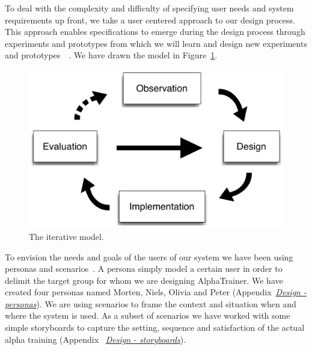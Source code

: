 \documentclass[a4paper,10pt,english,lof,lot,twoside]{puthesis}
\begin{document}
To deal with the complexity and difficulty of specifying user needs and system
requirements up front, we take a user centered approach to our design
process. This approach enables specifications to emerge during the design
process through experiments and prototypes from which we will learn and design
new experiments and prototypes \cite{benyon_designing_2005} \cite{klemmer_how_2006}. We have drawn the model in Figure \ref{ch-design/index:fig-iterative-model}.
\begin{figure}[tbp]
\centering
\capstart

\includegraphics[width=0.600\linewidth]{theiterativemodel.png}
\caption[The iterative model.]{The iterative model.}\label{ch-design/index:fig-iterative-model}\end{figure}

To envision the needs and goals of the users of our system we have been using
personas and scenarios \cite{kollmann_importance_2009}\cite{benyon_designing_2010}. A persona simply model a certain user in order
to delimit the target group for whom we are designing AlphaTrainer. We have
created four personas named Morten, Niels, Olivia and Peter (Appendix {\hyperref[appendix_design_personas:appendix-design-personas]{\emph{Design - personas}}}). We are using scenarios to frame the context
and situation when and where the system is used. As a subset of scenarios we
have worked with some simple storyboards to capture the setting, sequence and
satisfaction of the actual alpha training (Appendix 
{\hyperref[appendix_design_storyboards:appendix-design-storyboards]{\emph{Design - storyboards}}}).
\end{document}
